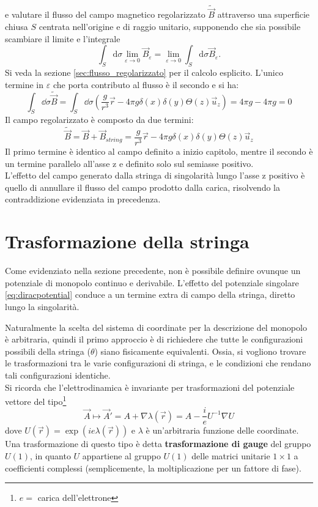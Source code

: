 e valutare il flusso del campo magnetico regolarizzato $\tilde{\vec B}$
attraverso una superficie chiusa $S$ centrata nell'origine e di raggio unitario, supponendo
che sia possibile scambiare il limite e l'integrale
%
$$
  \int_S \mathrm{d}{\sigma} \lim_{\varepsilon \to 0} \vec B_\varepsilon
     = \lim_{\varepsilon \to 0} \int_S \mathrm{d}\sigma \vec B_\varepsilon .
$$
%
Si veda la sezione \ref{sec:flusso_regolarizzato} per il calcolo esplicito.
L'unico termine in $\varepsilon$ che porta contributo al flusso è il secondo e si
ha:
$$
   \int_S \dd\sigma \tilde{\vec B}
      = \int_S \dd \sigma \left( \frac{g}{r^3}\vec r
         - 4\pi g \delta(x)\delta(y)\Theta(z) \vec u _z \right)
      = 4\pi g - 4\pi g = 0
$$
%
Il campo regolarizzato è composto da due termini:
$$
   \tilde{\vec B} = \vec B + \vec B _{string} = \frac{g}{r^3}\vec r
      - 4\pi g \delta(x)\delta(y)\Theta(z) \vec u _z
$$
Il primo termine è identico al campo definito a inizio capitolo, mentre il secondo
è un termine parallelo all'asse z e definito solo sul semiasse positivo.\\
L'effetto del campo generato dalla stringa di singolarità lungo l'asse z positivo
è quello di annullare il flusso del campo prodotto dalla carica, risolvendo la
contraddizione evidenziata in precedenza.


\section{Trasformazione della stringa}\label{sec:gaugestring}
Come evidenziato nella sezione precedente, non è possibile definire ovunque un
potenziale di monopolo continuo e derivabile. L'effetto del potenziale singolare
\ref{eq:diracpotential} conduce a un termine extra di campo della stringa,
diretto lungo la singolarità.

Naturalmente la scelta del sistema di coordinate per la descrizione del monopolo
è arbitraria, quindi il primo approccio è di richiedere che tutte le configurazioni
possibili della stringa ($\theta$) siano fisicamente equivalenti.
Ossia, si vogliono trovare le trasformazioni tra le varie configurazioni di stringa,
e le condizioni che rendano tali configurazioni identiche.\\

Si ricorda che l'elettrodinamica è invariante per trasformazioni del potenziale
vettore del tipo\footnote{$e =$ carica dell'elettrone}
\begin{equation}
   \vec A \mapsto \vec A' = A + \nabla \lambda (\vec r) = A - \frac{i}{e}
    U^{-1}\nabla U
\end{equation}
dove $U(\vec r) = \exp(ie\lambda(\vec r))$ e $\lambda$ è un'arbitraria funzione
delle coordinate. Una trasformazione di questo tipo è detta
\textbf{trasformazione di gauge}  del gruppo $U(1)$, in quanto $U$ appartiene
  al gruppo $U(1)$ delle matrici unitarie $1 \times 1$ a coefficienti complessi
  (semplicemente, la moltiplicazione per un fattore di fase).\\

